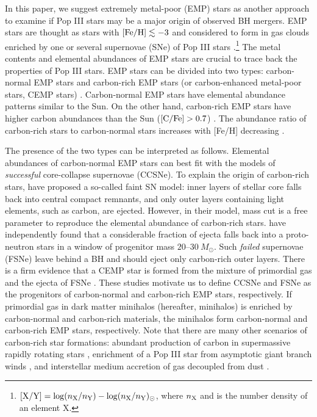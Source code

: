 \documentclass[pdftex]{pasj01}
\begin{document}
In this paper, we suggest extremely metal-poor (EMP) stars as
another approach to examine if Pop III stars may be a major origin of
observed BH mergers. EMP stars are thought as stars with ${\rm [Fe/H]}
\lesssim -3$ and considered to form in gas clouds enriched by one or
several supernovae (SNe) of Pop III stars \citep{1995ApJ...451L..49A,
  1996ApJ...471..254R, 2004A&A...416.1117C,
  2015ARA&A..53..631F}.\footnote{${\rm [X/Y]} = \log(n_{\rm X} /
  n_{\rm Y}) - \log(n_{\rm X} / n_{\rm Y})_{\odot}$, where $n_{\rm X}$
  and is the number density of an element X.}  The metal contents and
elemental abundances of EMP stars are crucial to trace back the
properties of Pop III stars. EMP stars can be divided into two types:
carbon-normal EMP stars and carbon-rich EMP stars (or carbon-enhanced
metal-poor stars, CEMP stars) \citep{2005ARA&A..43..531B}.
Carbon-normal EMP stars have elemental abundance patterns similar to
the Sun.  On the other hand, carbon-rich EMP stars have higher carbon
abundances than the Sun (${\rm [C/Fe]} > 0.7$)
\citep{2007ApJ...655..492A}. The abundance ratio of carbon-rich stars
to carbon-normal stars increases with [Fe/H] decreasing
\citep{2005ARA&A..43..531B, 2013ApJ...762...26Y}.

The presence of the two types can be interpreted as follows.
Elemental abundances of carbon-normal EMP stars can best fit with the
models of {\it successful} core-collapse supernovae (CCSNe).  To
explain the origin of carbon-rich stars, \citet{2003Natur.422..871U}
have proposed a so-called faint SN model: inner layers of stellar core
falls back into central compact remnants, and only outer layers
containing light elements, such as carbon, are ejected.  However, in
their model, mass cut is a free parameter to reproduce the elemental
abundance of carbon-rich stars.  \citet{2012ApJ...749...91F} have
independently found that a considerable fraction of ejecta falls back
into a proto-neutron stars in a window of progenitor mass
$20$--$30~M_{\odot}$.  Such {\it failed} supernovae (FSNe) leave
behind a BH and should eject only carbon-rich outer layers. There is a
firm evidence that a CEMP star is formed from the mixture of
primordial gas and the ejecta of FSNe
\citep{2013ApJ...773...33I}. These studies motivate us to define CCSNe
and FSNe as the progenitors of carbon-normal and carbon-rich EMP
stars, respectively. If primordial gas in dark matter minihalos
(hereafter, minihalos) is enriched by carbon-normal and carbon-rich
materials, the minihalos form carbon-normal and carbon-rich EMP stars,
respectively. Note that there are many other scenarios of carbon-rich
star formations: abundant production of carbon in supermassive rapidly
rotating stars \citep{2001ApJ...550..372F, 2021MNRAS.506.5247L},
enrichment of a Pop III star from asymptotic giant branch winds
\citep{2004ApJ...611..476S, 2010A&A...522L...6C}, and interstellar
medium accretion of gas decoupled from dust
\citep{2015MNRAS.453.2771J}.
\end{document}
